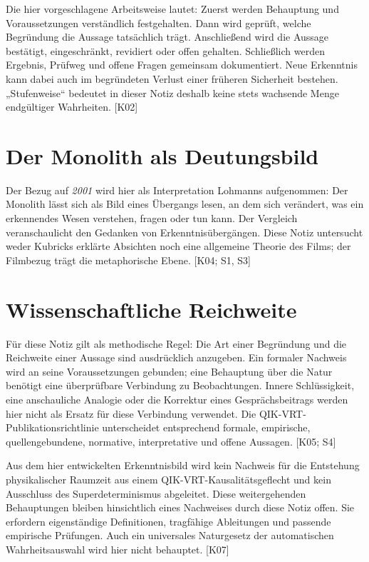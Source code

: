 \documentclass[11pt,a4paper]{article}
\begin{document}
Die hier vorgeschlagene Arbeitsweise lautet: Zuerst werden Behauptung und Voraussetzungen verständlich festgehalten. Dann wird geprüft, welche Begründung die Aussage tatsächlich trägt. Anschließend wird die Aussage bestätigt, eingeschränkt, revidiert oder offen gehalten. Schließlich werden Ergebnis, Prüfweg und offene Fragen gemeinsam dokumentiert. Neue Erkenntnis kann dabei auch im begründeten Verlust einer früheren Sicherheit bestehen. „Stufenweise“ bedeutet in dieser Notiz deshalb keine stets wachsende Menge endgültiger Wahrheiten. [K02]

\section*{Der Monolith als Deutungsbild}

Der Bezug auf \emph{2001} wird hier als Interpretation Lohmanns aufgenommen: Der Monolith lässt sich als Bild eines Übergangs lesen, an dem sich verändert, was ein erkennendes Wesen verstehen, fragen oder tun kann. Der Vergleich veranschaulicht den Gedanken von Erkenntnisübergängen. Diese Notiz untersucht weder Kubricks erklärte Absichten noch eine allgemeine Theorie des Films; der Filmbezug trägt die metaphorische Ebene. [K04; S1, S3]

\newpage\thispagestyle{fancy}
\section*{Wissenschaftliche Reichweite}

Für diese Notiz gilt als methodische Regel: Die Art einer Begründung und die Reichweite einer Aussage sind ausdrücklich anzugeben. Ein formaler Nachweis wird an seine Voraussetzungen gebunden; eine Behauptung über die Natur benötigt eine überprüfbare Verbindung zu Beobachtungen. Innere Schlüssigkeit, eine anschauliche Analogie oder die Korrektur eines Gesprächsbeitrags werden hier nicht als Ersatz für diese Verbindung verwendet. Die QIK-VRT-Publikationsrichtlinie unterscheidet entsprechend formale, empirische, quellengebundene, normative, interpretative und offene Aussagen. [K05; S4]

Aus dem hier entwickelten Erkenntnisbild wird kein Nachweis für die Entstehung physikalischer Raumzeit aus einem QIK-VRT-Kausalitätsgeflecht und kein Ausschluss des Superdeterminismus abgeleitet. Diese weitergehenden Behauptungen bleiben hinsichtlich eines Nachweises durch diese Notiz offen. Sie erfordern eigenständige Definitionen, tragfähige Ableitungen und passende empirische Prüfungen. Auch ein universales Naturgesetz der automatischen Wahrheitsauswahl wird hier nicht behauptet. [K07]
\end{document}
